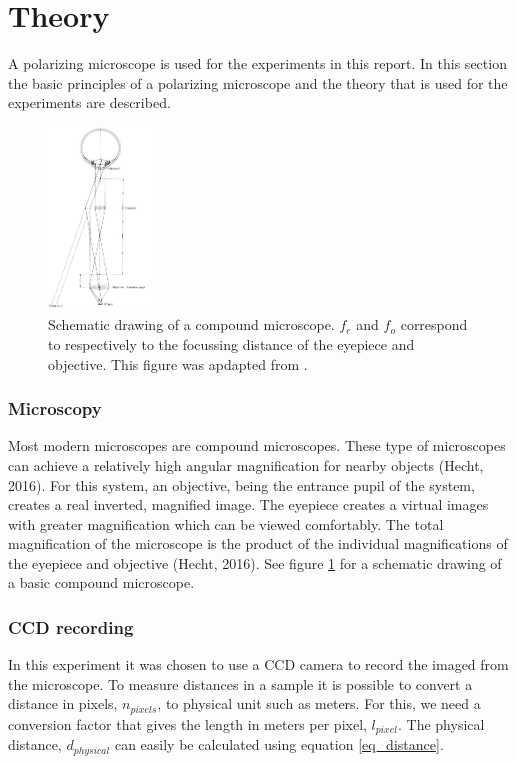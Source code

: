 \section{Theory}

A polarizing microscope is used for the experiments in this report. In this section the basic principles of a polarizing microscope and the theory that is used for the experiments are described.

\begin{figure}
    \includegraphics[width=0.25\textwidth]{afbeeldingen/compound_microscope.png}
  	\caption{Schematic drawing of a compound microscope. $f_{e}$ and $f_{o}$ correspond to respectively to the focussing distance of the eyepiece and objective. This figure was apdapted from \cite{hecht}.}
  	\label{fig_compound_microscope}
\end{figure}

\subsubsection{Microscopy}

Most modern microscopes are compound microscopes. These type of microscopes can achieve a relatively high angular magnification for nearby objects (Hecht, 2016). For this system, an objective, being the entrance pupil of the system, creates a real inverted, magnified image. The eyepiece creates a virtual images with greater magnification which can be viewed comfortably. The total magnification of the microscope is the product of the individual magnifications of the eyepiece and objective (Hecht, 2016). See figure \ref{fig_compound_microscope} for a schematic drawing of a basic compound microscope.



\subsubsection{CCD recording}
In this experiment it was chosen to use a CCD camera to record the imaged from the microscope. To measure distances in a sample it is possible to convert a distance in pixels, $n_{pixels}$, to physical unit such as meters. For this, we need a conversion factor that gives the length in meters per pixel, $l_{pixel}$. The physical distance, $d_{physical}$ can easily be calculated using equation \ref{eq_distance}.

